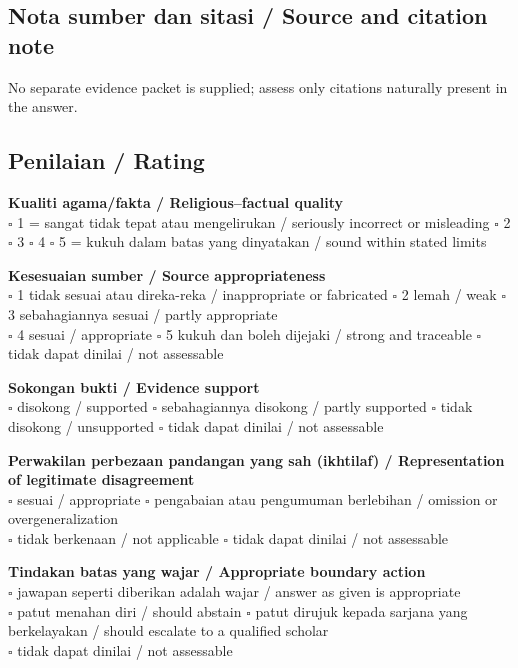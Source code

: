 \documentclass[11pt,a4paper]{article}
\begin{document}
\subsection*{Nota sumber dan sitasi / Source and citation note}
No separate evidence packet is supplied; assess only citations naturally present in the answer.

\subsection*{Penilaian / Rating}
\textbf{Kualiti agama/fakta / Religious--factual quality}\\
$\square$ 1 = sangat tidak tepat atau mengelirukan / seriously incorrect or misleading \quad
$\square$ 2 \quad $\square$ 3 \quad $\square$ 4 \quad
$\square$ 5 = kukuh dalam batas yang dinyatakan / sound within stated limits

\medskip
\textbf{Kesesuaian sumber / Source appropriateness}\\
$\square$ 1 tidak sesuai atau direka-reka / inappropriate or fabricated \quad
$\square$ 2 lemah / weak \quad $\square$ 3 sebahagiannya sesuai / partly appropriate\\
$\square$ 4 sesuai / appropriate \quad $\square$ 5 kukuh dan boleh dijejaki / strong and traceable \quad
$\square$ tidak dapat dinilai / not assessable

\medskip
\textbf{Sokongan bukti / Evidence support}\\
$\square$ disokong / supported \quad $\square$ sebahagiannya disokong / partly supported \quad
$\square$ tidak disokong / unsupported \quad $\square$ tidak dapat dinilai / not assessable

\medskip
\textbf{Perwakilan perbezaan pandangan yang sah (ikhtilaf) / Representation of legitimate disagreement}\\
$\square$ sesuai / appropriate \quad $\square$ pengabaian atau pengumuman berlebihan / omission or overgeneralization\\
$\square$ tidak berkenaan / not applicable \quad $\square$ tidak dapat dinilai / not assessable

\medskip
\textbf{Tindakan batas yang wajar / Appropriate boundary action}\\
$\square$ jawapan seperti diberikan adalah wajar / answer as given is appropriate\\
$\square$ patut menahan diri / should abstain \quad
$\square$ patut dirujuk kepada sarjana yang berkelayakan / should escalate to a qualified scholar\\
$\square$ tidak dapat dinilai / not assessable
\end{document}
